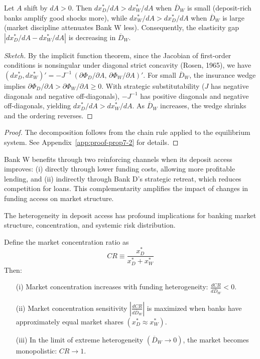 \documentclass[12pt]{article}
\begin{document}
\begin{proposition}\label{prop:amplification}
Let $A$ shift by $dA>0$. Then $dx_D^{*}/dA > dx_W^{*}/dA$ when $\overline{D}_W$ is small (deposit-rich banks amplify good shocks more), while $dx_W^{*}/dA > dx_D^{*}/dA$ when $\overline{D}_W$ is large (market discipline attenuates Bank W less). Consequently, the elasticity gap $|dx_D^{*}/dA - dx_W^{*}/dA|$ is decreasing in $\overline{D}_W$.
\end{proposition}

\begin{proof}[Sketch]
By the implicit function theorem, since the Jacobian of first-order conditions is nonsingular under diagonal strict concavity (Rosen, 1965), we have
$(dx_D^{*},dx_W^{*})' = -J^{-1}\,(\partial\Phi_D/\partial A,\,\partial\Phi_W/\partial A)'$. For small $\overline{D}_W$, the insurance wedge implies $\partial\Phi_D/\partial A>\partial\Phi_W/\partial A\ge 0$. With strategic substitutability ($J$ has negative diagonals and negative off-diagonals), $-J^{-1}$ has positive diagonals and negative off-diagonals, yielding $dx_D^{*}/dA>dx_W^{*}/dA$. As $\overline{D}_W$ increases, the wedge shrinks and the ordering reverses.
\end{proof}

\begin{proof}
The decomposition follows from the chain rule applied to the equilibrium system. See Appendix~\ref{app:proof-prop7-2} for details.
\end{proof}

\begin{remark}
Bank W benefits through two reinforcing channels when its deposit access improves: (i) directly through lower funding costs, allowing more profitable lending, and (ii) indirectly through Bank D's strategic retreat, which reduces competition for loans. This complementarity amplifies the impact of changes in funding access on market structure.
\end{remark}

The heterogeneity in deposit access has profound implications for banking market structure, concentration, and systemic risk distribution.

\begin{proposition}\label{prop:market-concentration}
Define the market concentration ratio as
\begin{equation*}
CR \equiv \frac{x_D^*}{x_D^* + x_W^*}
\end{equation*}
Then:
\begin{enumerate}
    \item[(i)] Market concentration increases with funding heterogeneity: $\frac{dCR}{d\overline{D}_{W}} < 0$.
    \item[(ii)] Market concentration sensitivity $|\frac{dCR}{d\overline{D}_{W}}|$ is maximized when banks have approximately equal market shares $(x_{D}^{*} \approx x_{W}^{*})$.
    \item[(iii)] In the limit of extreme heterogeneity $(\overline{D}_{W} \to 0)$, the market becomes monopolistic: $CR \to 1$.
\end{enumerate}
\end{proposition}
\end{document}
